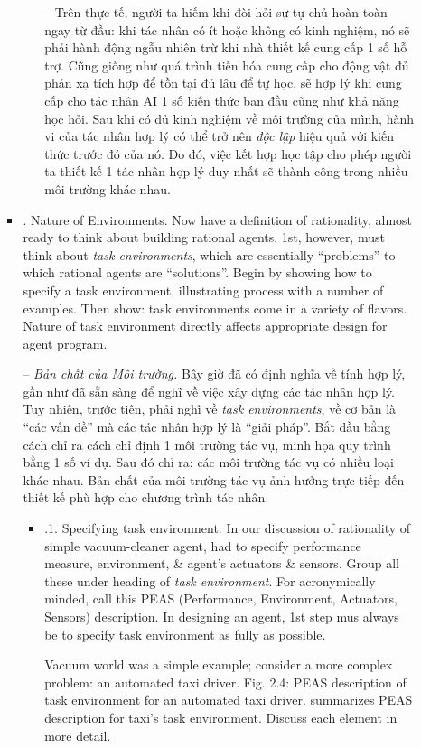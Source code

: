\documentclass{article}
\begin{document}
\begin{itemize}
\begin{itemize}
\begin{itemize}
\begin{itemize}
				-- Trên thực tế, người ta hiếm khi đòi hỏi sự tự chủ hoàn toàn ngay từ đầu: khi tác nhân có ít hoặc không có kinh nghiệm, nó sẽ phải hành động ngẫu nhiên trừ khi nhà thiết kế cung cấp 1 số hỗ trợ. Cũng giống như quá trình tiến hóa cung cấp cho động vật đủ phản xạ tích hợp để tồn tại đủ lâu để tự học, sẽ hợp lý khi cung cấp cho tác nhân AI 1 số kiến thức ban đầu cũng như khả năng học hỏi. Sau khi có đủ kinh nghiệm về môi trường của mình, hành vi của tác nhân hợp lý có thể trở nên {\it độc lập} hiệu quả với kiến thức trước đó của nó. Do đó, việc kết hợp học tập cho phép người ta thiết kế 1 tác nhân hợp lý duy nhất sẽ thành công trong nhiều môi trường khác nhau.
			\end{itemize}
			\item {. Nature of Environments.} Now have a definition of rationality, almost ready to think about building rational agents. 1st, however, must think about {\it task environments}, which are essentially ``problems'' to which rational agents are ``solutions''. Begin by showing how to specify a task environment, illustrating process with a number of examples. Then show: task environments come in a variety of flavors. Nature of task environment directly affects appropriate design for agent program.

			-- {\it Bản chất của Môi trường.} Bây giờ đã có định nghĩa về tính hợp lý, gần như đã sẵn sàng để nghĩ về việc xây dựng các tác nhân hợp lý. Tuy nhiên, trước tiên, phải nghĩ về {\it task environments}, về cơ bản là ``các vấn đề'' mà các tác nhân hợp lý là ``giải pháp''. Bắt đầu bằng cách chỉ ra cách chỉ định 1 môi trường tác vụ, minh họa quy trình bằng 1 số ví dụ. Sau đó chỉ ra: các môi trường tác vụ có nhiều loại khác nhau. Bản chất của môi trường tác vụ ảnh hưởng trực tiếp đến thiết kế phù hợp cho chương trình tác nhân.
			\begin{itemize}
				\item {.1. Specifying task environment.} In our discussion of rationality of simple vacuum-cleaner agent, had to specify performance measure, environment, \& agent's actuators \& sensors. Group all these under heading of {\it task environment}. For acronymically minded, call this PEAS (Performance, Environment, Actuators, Sensors) description. In designing an agent, 1st step mus always be to specify task environment as fully as possible.

				Vacuum world was a simple example; consider a more complex problem: an automated taxi driver. {\sf Fig. 2.4: PEAS description of task environment for an automated taxi driver.} summarizes PEAS description for taxi's task environment. Discuss each element in more detail.


\end{itemize}
\end{itemize}
\end{itemize}
\end{itemize}
\end{document}
